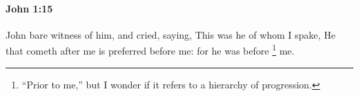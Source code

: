			\begin{framed}
			\scriptsize
				\begin{compactdesc}
					\item[SBLG]  \hyperref[LOGOS]{} 
				\end{compactdesc}
			\end{framed}

		\paragraph{John 1:15} %
			\label{JOHN-1-15}

			John bare witness of him, and cried, saying, This was he of whom I spake, He that cometh after me is preferred before me: for he was before%
				\footnote{%
					``Prior to me,'' but I wonder if it refers to a hierarchy of progression.
					}
			me.

